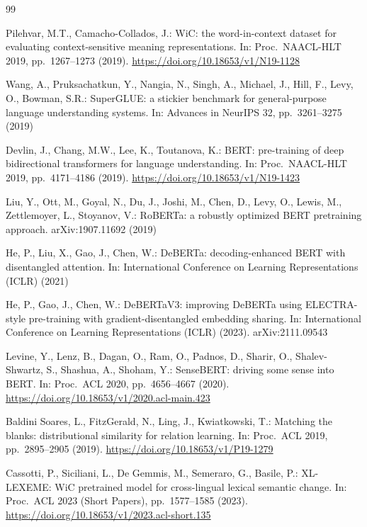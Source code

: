 \documentclass[runningheads]{llncs}
\begin{document}
\begin{thebibliography}{99}

Pilehvar, M.T., Camacho-Collados, J.: WiC: the word-in-context dataset for
evaluating context-sensitive meaning representations. In: Proc.\ NAACL-HLT 2019,
pp.\ 1267--1273 (2019). \url{https://doi.org/10.18653/v1/N19-1128}

Wang, A., Pruksachatkun, Y., Nangia, N., Singh, A., Michael, J., Hill, F.,
Levy, O., Bowman, S.R.: SuperGLUE: a stickier benchmark for general-purpose
language understanding systems. In: Advances in NeurIPS 32, pp.\ 3261--3275
(2019)

Devlin, J., Chang, M.W., Lee, K., Toutanova, K.: BERT: pre-training of deep
bidirectional transformers for language understanding. In: Proc.\ NAACL-HLT
2019, pp.\ 4171--4186 (2019). \url{https://doi.org/10.18653/v1/N19-1423}

Liu, Y., Ott, M., Goyal, N., Du, J., Joshi, M., Chen, D., Levy, O., Lewis, M.,
Zettlemoyer, L., Stoyanov, V.: RoBERTa: a robustly optimized BERT pretraining
approach. arXiv:1907.11692 (2019)

He, P., Liu, X., Gao, J., Chen, W.: DeBERTa: decoding-enhanced BERT with
disentangled attention. In: International Conference on Learning Representations
(ICLR) (2021)

He, P., Gao, J., Chen, W.: DeBERTaV3: improving DeBERTa using ELECTRA-style
pre-training with gradient-disentangled embedding sharing. In: International
Conference on Learning Representations (ICLR) (2023). arXiv:2111.09543

Levine, Y., Lenz, B., Dagan, O., Ram, O., Padnos, D., Sharir, O.,
Shalev-Shwartz, S., Shashua, A., Shoham, Y.: SenseBERT: driving some sense into
BERT. In: Proc.\ ACL 2020, pp.\ 4656--4667 (2020).
\url{https://doi.org/10.18653/v1/2020.acl-main.423}

Baldini Soares, L., FitzGerald, N., Ling, J., Kwiatkowski, T.: Matching the
blanks: distributional similarity for relation learning. In: Proc.\ ACL 2019,
pp.\ 2895--2905 (2019). \url{https://doi.org/10.18653/v1/P19-1279}

Cassotti, P., Siciliani, L., De Gemmis, M., Semeraro, G., Basile, P.:
XL-LEXEME: WiC pretrained model for cross-lingual lexical semantic change. In:
Proc.\ ACL 2023 (Short Papers), pp.\ 1577--1585 (2023).
\url{https://doi.org/10.18653/v1/2023.acl-short.135}


\end{thebibliography}
\end{document}

